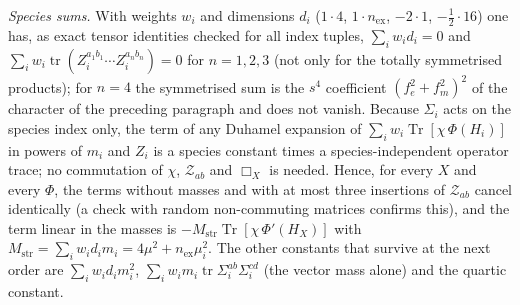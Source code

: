 \emph{Species sums.} With weights \(w_i\) and dimensions \(d_i\) (\(1\cdot4\), \(1\cdot n_{\mathrm{ex}}\), \(-2\cdot1\), \(-\tfrac12\cdot16\)) one has, as exact tensor identities checked for all index tuples, \(\sum_iw_id_i=0\) and \(\sum_iw_i\operatorname{tr}(Z_i^{a_1b_1}\cdots Z_i^{a_nb_n})=0\) for \(n=1,2,3\) (not only for the totally symmetrised products); for \(n=4\) the symmetrised sum is the \(s^4\) coefficient \((f_e^2+f_m^2)^2\) of the character of the preceding paragraph and does not vanish. Because \(\Sigma_i\) acts on the species index only, the term of any Duhamel expansion of \(\sum_iw_i\operatorname{Tr}[\chi\,\Phi(H_i)]\) in powers of \(m_i\) and \(Z_i\) is a species constant times a species-independent operator trace; no commutation of \(\chi\), \(\mathcal Z_{ab}\) and \(\Box_X\) is needed. Hence, for every \(X\) and every \(\Phi\), the terms without masses and with at most three insertions of \(\mathcal Z_{ab}\) cancel identically (a check with random non-commuting matrices confirms this), and the term linear in the masses is \(-M_{\mathrm{str}}\operatorname{Tr}[\chi\,\Phi'(H_X)]\) with \(M_{\mathrm{str}}=\sum_iw_id_im_i=4\mu^2+n_{\mathrm{ex}}\mu_i^2\). The other constants that survive at the next order are \(\sum_iw_id_im_i^2\), \(\sum_iw_im_i\operatorname{tr}\Sigma_i^{ab}\Sigma_i^{cd}\) (the vector mass alone) and the quartic constant.

